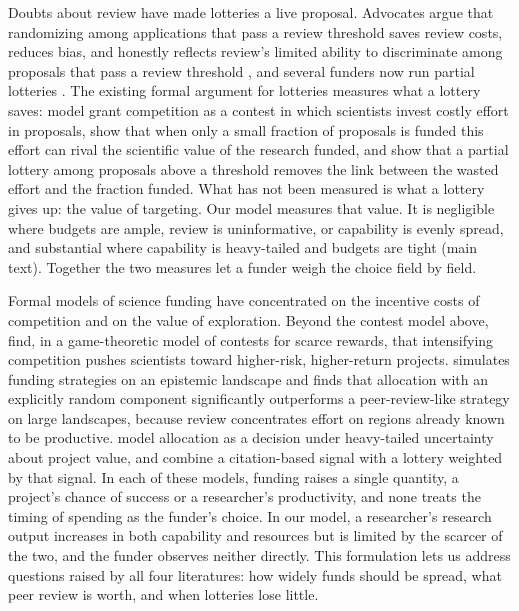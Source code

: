 Doubts about review have made lotteries a live proposal. Advocates argue that randomizing among applications that pass a review threshold saves review costs, reduces bias, and honestly reflects review's limited ability to discriminate among proposals that pass a review threshold \citep{FangCasadevall2016, Avin2019, Roumbanis2019}, and several funders now run partial lotteries \citep{Liu2020, Heyard2022, Luebber2025}. The existing formal argument for lotteries measures what a lottery saves: \citet{GrossBergstrom2019} model grant competition as a contest in which scientists invest costly effort in proposals, show that when only a small fraction of proposals is funded this effort can rival the scientific value of the research funded, and show that a partial lottery among proposals above a threshold removes the link between the wasted effort and the fraction funded. What has not been measured is what a lottery gives up: the value of targeting. Our model measures that value. It is negligible where budgets are ample, review is uninformative, or capability is evenly spread, and substantial where capability is heavy-tailed and budgets are tight (main text). Together the two measures let a funder weigh the choice field by field.

Formal models of science funding have concentrated on the incentive costs of competition and on the value of exploration. Beyond the contest model above, \citet{GrossBergstrom2025} find, in a game-theoretic model of contests for scarce rewards, that intensifying competition pushes scientists toward higher-risk, higher-return projects. \citet{AvinBJPS2019} simulates funding strategies on an epistemic landscape and finds that allocation with an explicitly random component significantly outperforms a peer-review-like strategy on large landscapes, because review concentrates effort on regions already known to be productive. \citet{Sorzano2026} model allocation as a decision under heavy-tailed uncertainty about project value, and combine a citation-based signal with a lottery weighted by that signal. In each of these models, funding raises a single quantity, a project's chance of success or a researcher's productivity, and none treats the timing of spending as the funder's choice. In our model, a researcher's research output increases in both capability and resources but is limited by the scarcer of the two, and the funder observes neither directly. This formulation lets us address questions raised by all four literatures: how widely funds should be spread, what peer review is worth, and when lotteries lose little.
